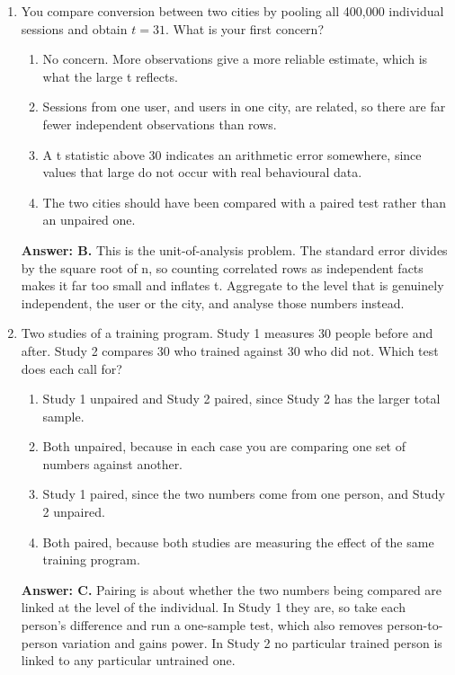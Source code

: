 \documentclass[11pt]{article}
\begin{document}
\begin{enumerate}[itemsep=14pt]
\item You compare conversion between two cities by pooling all 400,000 individual sessions and obtain $t = 31$. What is your first concern?

\begin{enumerate}[label=\Alph*., itemsep=1pt, topsep=3pt]
  \item No concern. More observations give a more reliable estimate, which is what the large t reflects.
  \item Sessions from one user, and users in one city, are related, so there are far fewer independent observations than rows.
  \item A t statistic above 30 indicates an arithmetic error somewhere, since values that large do not occur with real behavioural data.
  \item The two cities should have been compared with a paired test rather than an unpaired one.
\end{enumerate}

\vspace{2pt}
\textbf{Answer: B.} This is the unit-of-analysis problem. The standard error divides by the square root of n, so counting correlated rows as independent facts makes it far too small and inflates t. Aggregate to the level that is genuinely independent, the user or the city, and analyse those numbers instead.
\vspace{4pt}

\item Two studies of a training program. Study 1 measures 30 people before and after. Study 2 compares 30 who trained against 30 who did not. Which test does each call for?

\begin{enumerate}[label=\Alph*., itemsep=1pt, topsep=3pt]
  \item Study 1 unpaired and Study 2 paired, since Study 2 has the larger total sample.
  \item Both unpaired, because in each case you are comparing one set of numbers against another.
  \item Study 1 paired, since the two numbers come from one person, and Study 2 unpaired.
  \item Both paired, because both studies are measuring the effect of the same training program.
\end{enumerate}

\vspace{2pt}
\textbf{Answer: C.} Pairing is about whether the two numbers being compared are linked at the level of the individual. In Study 1 they are, so take each person's difference and run a one-sample test, which also removes person-to-person variation and gains power. In Study 2 no particular trained person is linked to any particular untrained one.
\vspace{4pt}


\end{enumerate}
\end{document}
